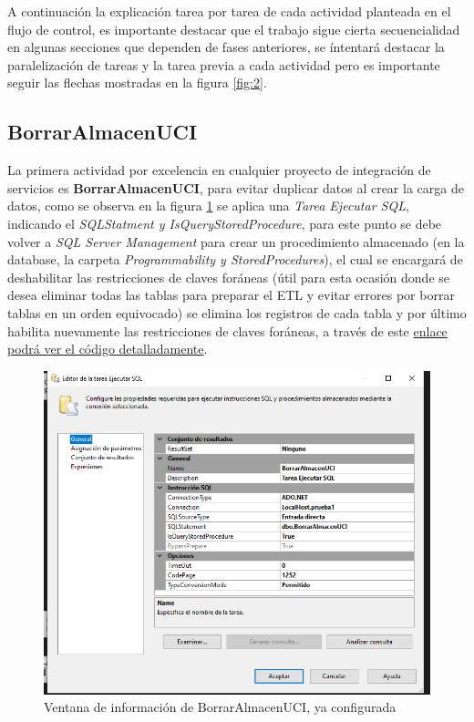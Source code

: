 \documentclass[12pt, a4paper, twoside]{article}
\begin{document}
	A continuación la explicación tarea por tarea de cada actividad planteada en el flujo de control, es importante destacar que el trabajo sigue cierta secuencialidad en algunas secciones que dependen de fases anteriores, se íntentará destacar la paralelización de tareas y la tarea previa a cada actividad pero es importante seguir las flechas mostradas en la figura \ref{fig:2}. 
	
	\subsection{BorrarAlmacenUCI}	
		
	La primera actividad por excelencia en cualquier proyecto de integración de servicios es \textbf{BorrarAlmacenUCI}, para evitar duplicar datos al crear la carga de datos, como se observa en la figura \ref{fig:3} se aplica una \textit{Tarea Ejecutar SQL}, indicando el \textit{SQLStatment y IsQueryStoredProcedure}, para este punto se debe volver a \textit{SQL Server Management} para crear un procedimiento almacenado (en la database, la carpeta \textit{Programmability y StoredProcedures}), el cual se encargará de deshabilitar las restricciones de claves foráneas (útil para esta ocasión donde se desea eliminar todas las tablas para preparar el ETL y evitar errores por borrar tablas en un orden equivocado) se elimina los registros de cada tabla y por último habilita nuevamente las restricciones de claves foráneas, a través de este \href{https://github.com/Diegodepab/almacen_UCI_Sanitaria/blob/main/ETL/BorrarAlmacenUCI.sql}{enlace podrá ver el código detalladamente}.

	\begin{figure}[H]
		\centering
		\includegraphics[width=1\textwidth]{image/101_BorrarAlmacenUCI.png}
		\caption{Ventana de información de BorrarAlmacenUCI, ya configurada}
		\label{fig:3}
	\end{figure}
	
\end{document}
